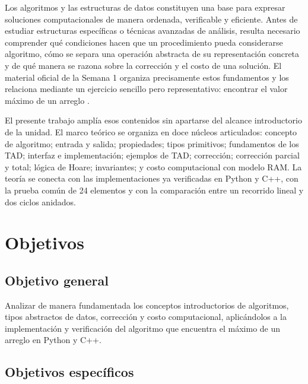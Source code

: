 \documentclass[12pt,letterpaper]{article}
\begin{document}
Los algoritmos y las estructuras de datos constituyen una base para expresar soluciones computacionales de manera ordenada, verificable y eficiente. Antes de estudiar estructuras específicas o técnicas avanzadas de análisis, resulta necesario comprender qué condiciones hacen que un procedimiento pueda considerarse algoritmo, cómo se separa una operación abstracta de su representación concreta y de qué manera se razona sobre la corrección y el costo de una solución. El material oficial de la Semana 1 organiza precisamente estos fundamentos y los relaciona mediante un ejercicio sencillo pero representativo: encontrar el valor máximo de un arreglo \citep{zanabria2026,cormen2022,sedgewick2011}.

El presente trabajo amplía esos contenidos sin apartarse del alcance introductorio de la unidad. El marco teórico se organiza en doce núcleos articulados: concepto de algoritmo; entrada y salida; propiedades; tipos primitivos; fundamentos de los TAD; interfaz e implementación; ejemplos de TAD; corrección; corrección parcial y total; lógica de Hoare; invariantes; y costo computacional con modelo RAM. La teoría se conecta con las implementaciones ya verificadas en Python y C++, con la prueba común de 24 elementos y con la comparación entre un recorrido lineal y dos ciclos anidados.

\section{Objetivos}

\subsection{Objetivo general}

Analizar de manera fundamentada los conceptos introductorios de algoritmos, tipos abstractos de datos, corrección y costo computacional, aplicándolos a la implementación y verificación del algoritmo que encuentra el máximo de un arreglo en Python y C++.

\subsection{Objetivos específicos}
\end{document}
